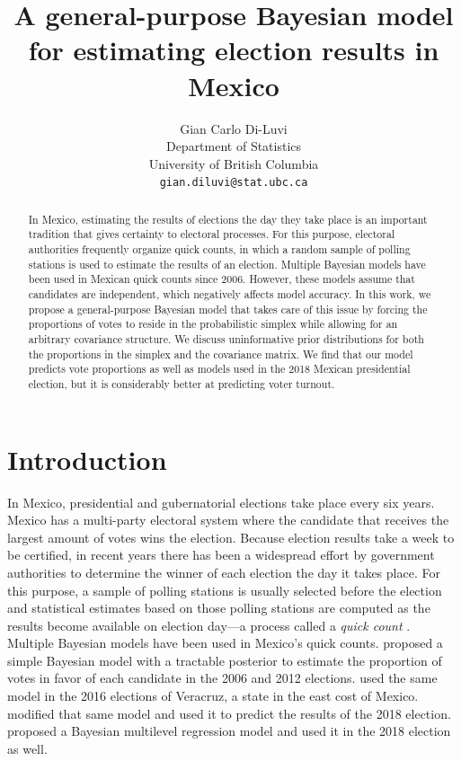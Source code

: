 \documentclass{article}
\title{A general-purpose Bayesian model for estimating election results in Mexico}
\author{%
  Gian Carlo Di-Luvi \\
  Department of Statistics\\
  University of British Columbia \\
  \texttt{gian.diluvi@stat.ubc.ca}
}
\begin{document}
\maketitle

\begin{abstract}
  In Mexico, estimating the results of elections the day they take place is an important tradition that gives certainty to electoral processes. For this purpose, electoral authorities frequently organize quick counts, in which a random sample of polling stations is used to estimate the results of an election. Multiple Bayesian models have been used in Mexican quick counts since 2006. However, these models assume that candidates are independent, which negatively affects model accuracy. In this work, we propose a general-purpose Bayesian model that takes care of this issue by forcing the proportions of votes to reside in the probabilistic simplex while allowing for an arbitrary covariance structure. We discuss uninformative prior distributions for both the proportions in the simplex and the covariance matrix. We find that our model predicts vote proportions as well as models used in the 2018 Mexican presidential election, but it is considerably better at predicting voter turnout.
\end{abstract}



\section{Introduction} \label{sec:intro}


In Mexico, presidential and gubernatorial elections take place every six years. Mexico has a multi-party electoral system where the candidate that receives the largest amount of votes wins the election. Because election results take a week to be certified, in recent years there has been a widespread effort by government authorities to determine the winner of each election the day it takes place. For this purpose, a sample of polling stations is usually selected before the election and statistical estimates based on those polling stations are computed as the results become available on election day---a process called a \textit{quick count} \citep{carrera2019}.
\\



Multiple Bayesian models have been used in Mexico's quick counts. \citet{mendoza-nieto2016} proposed a simple Bayesian model with a tractable posterior to estimate the proportion of votes in favor of each candidate in the 2006 and 2012 elections. \citet{cerrillo2019} used the same model in the 2016 elections of Veracruz, a state in the east cost of Mexico. \citet{diluvi2018} modified that same model and used it to predict the results of the 2018 election. \citet{anzarut2018} proposed a Bayesian multilevel regression model and used it in the 2018 election as well.
\\
\end{document}
